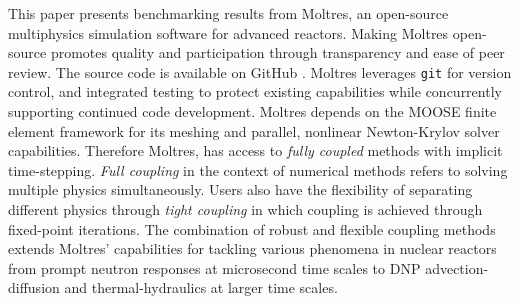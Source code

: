 This paper presents benchmarking results from Moltres, an open-source
multiphysics simulation software for advanced reactors. Making Moltres
open-source promotes quality and participation through transparency and
ease of peer review. The source code \cite{lindsay_moltres_2017} is available
on GitHub \cite{github_build_2017}. Moltres leverages \texttt{git} for
version control, and integrated testing to protect existing capabilities while
concurrently supporting continued code development. Moltres depends on the
\gls{MOOSE} finite element framework for its meshing and parallel, nonlinear
Newton-Krylov solver capabilities. Therefore Moltres, has access to
\textit{fully coupled} methods with implicit time-stepping.
\textit{Full coupling} in the context of numerical methods refers to
solving multiple physics simultaneously.
Users also have the flexibility of separating different physics through
\textit{tight coupling} in which coupling is achieved through
fixed-point iterations. The combination of robust and flexible coupling
methods extends Moltres' capabilities for tackling various phenomena in
nuclear reactors from prompt neutron responses at microsecond time scales to
\gls{DNP} advection-diffusion and thermal-hydraulics at larger time scales.
